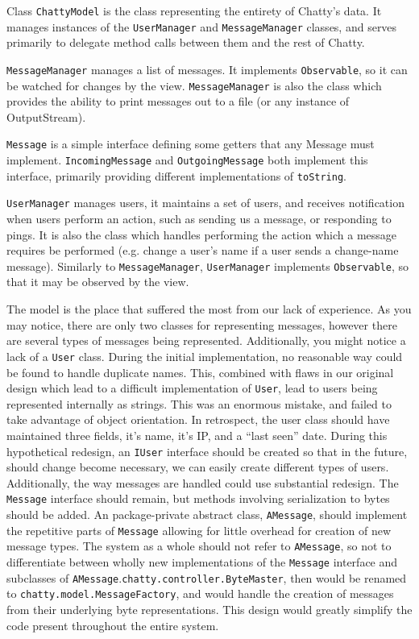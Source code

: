 \documentclass[oneside,article]{memoir}
\begin{document}
Class \texttt{ChattyModel} is the class representing the entirety of Chatty's
data. It manages instances of the \texttt{UserManager} and \texttt{MessageManager}
classes, and serves primarily to delegate method calls between them
and the rest of Chatty. 

\texttt{MessageManager} manages a list of messages. It implements
\texttt{Observable}, so it can be watched for changes by the view.
\texttt{MessageManager} is also the class which provides the ability to print
messages out to a file (or any instance of OutputStream).

\texttt{Message} is a simple interface defining some getters that any Message
must implement. \texttt{IncomingMessage} and \texttt{OutgoingMessage} both implement
this interface, primarily providing different implementations of
\texttt{toString}.

\texttt{UserManager} manages users, it maintains a set of users, and receives
notification when users perform an action, such as sending us a
message, or responding to pings. It is also the class which handles
performing the action which a message requires be performed
(e.g. change a user's name if a user sends a change-name
message). Similarly to \texttt{MessageManager}, \texttt{UserManager} implements
\texttt{Observable}, so that it may be observed by the view.

The model is the place that suffered the most from our lack of
experience. As you may notice, there are only two classes for
representing messages, however there are several types of messages
being represented. Additionally, you might notice a lack of a \texttt{User}
class. During the initial implementation, no reasonable way could be
found to handle duplicate names. This, combined with flaws in our
original design which lead to a difficult implementation of \texttt{User},
lead to users being represented internally as strings. This was an
enormous mistake, and failed to take advantage of object orientation.
In retrospect, the user class should have maintained three fields,
it's name, it's IP, and a ``last seen'' date. During this hypothetical
redesign, an \texttt{IUser} interface should be created so that in the
future, should change become necessary, we can easily create different
types of users. Additionally, the way messages are handled could use
substantial redesign. The \texttt{Message} interface should remain, but
methods involving serialization to bytes should be added. An
package-private abstract class, \texttt{AMessage}, should implement the
repetitive parts of \texttt{Message} allowing for little overhead for
creation of new message types. The system as a whole should not refer
to \texttt{AMessage}, so not to differentiate between wholly new
implementations of the \texttt{Message} interface and subclasses of
\texttt{AMessage}.\texttt{chatty.controller.ByteMaster}, then would be renamed to
\texttt{chatty.model.MessageFactory}, and would handle the creation of
messages from their underlying byte representations. This design would
greatly simplify the code present throughout the entire system.
\end{document}
